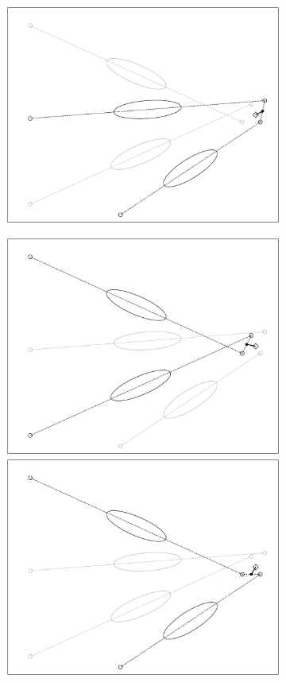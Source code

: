 \begin{figure}
\begin{subfigure}{0.45\textwidth}
        \includegraphics[width=\linewidth]{Plots/stereo_magic_3.pdf}
    \end{subfigure}
    \begin{subfigure}{0.45\textwidth}
        \includegraphics[width=\linewidth]{Plots/stereo_magic_4.pdf}
        \includegraphics[width=\linewidth]{Plots/stereo_magic_5.pdf} 

\end{subfigure}
\end{figure}
